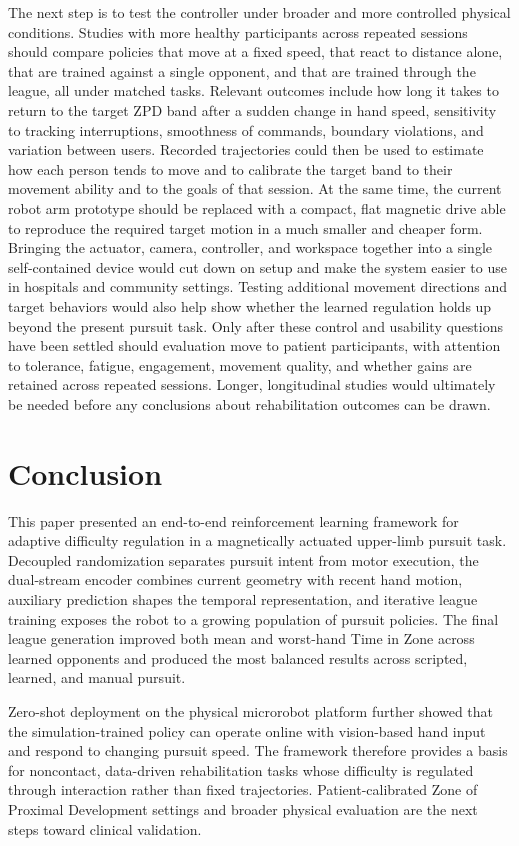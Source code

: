 \documentclass[journal,twoside,web]{ieeecolor2}
\begin{document}
The next step is to test the controller under broader and more controlled physical conditions. Studies with more healthy participants across repeated sessions should compare policies that move at a fixed speed, that react to distance alone, that are trained against a single opponent, and that are trained through the league, all under matched tasks. Relevant outcomes include how long it takes to return to the target ZPD band after a sudden change in hand speed, sensitivity to tracking interruptions, smoothness of commands, boundary violations, and variation between users. Recorded trajectories could then be used to estimate how each person tends to move and to calibrate the target band to their movement ability and to the goals of that session. At the same time, the current robot arm prototype should be replaced with a compact, flat magnetic drive able to reproduce the required target motion in a much smaller and cheaper form. Bringing the actuator, camera, controller, and workspace together into a single self-contained device would cut down on setup and make the system easier to use in hospitals and community settings. Testing additional movement directions and target behaviors would also help show whether the learned regulation holds up beyond the present pursuit task. Only after these control and usability questions have been settled should evaluation move to patient participants, with attention to tolerance, fatigue, engagement, movement quality, and whether gains are retained across repeated sessions. Longer, longitudinal studies would ultimately be needed before any conclusions about rehabilitation outcomes can be drawn.

\section{Conclusion}
This paper presented an end-to-end reinforcement learning framework for adaptive difficulty regulation in a magnetically actuated upper-limb pursuit task. Decoupled randomization separates pursuit intent from motor execution, the dual-stream encoder combines current geometry with recent hand motion, auxiliary prediction shapes the temporal representation, and iterative league training exposes the robot to a growing population of pursuit policies. The final league generation improved both mean and worst-hand Time in Zone across learned opponents and produced the most balanced results across scripted, learned, and manual pursuit.

Zero-shot deployment on the physical microrobot platform further showed that the simulation-trained policy can operate online with vision-based hand input and respond to changing pursuit speed. The framework therefore provides a basis for noncontact, data-driven rehabilitation tasks whose difficulty is regulated through interaction rather than fixed trajectories. Patient-calibrated Zone of Proximal Development settings and broader physical evaluation are the next steps toward clinical validation.
\end{document}
